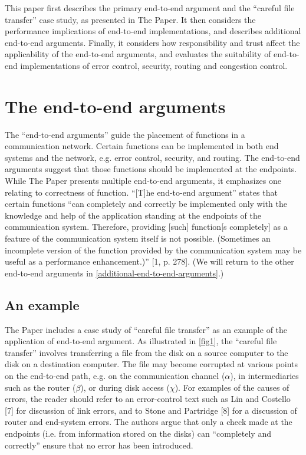 \documentclass[a4paper,11pt,notitlepage,twoside,openright]{article}
\begin{document}
This paper first describes the primary end-to-end argument and the
``careful file transfer'' case study, as presented in The Paper. It then
considers the performance implications of end-to-end implementations,
and describes additional end-to-end arguments. Finally, it considers how
responsibility and trust affect the applicability of the end-to-end
arguments, and evaluates the suitability of end-to-end implementations
of error control, security, routing and congestion control.

\hypertarget{the-end-to-end-arguments}{%
\section{The end-to-end arguments}\label{the-end-to-end-arguments}}

The ``end-to-end arguments'' guide the placement of functions in a
communication network. Certain functions can be implemented in both end
systems and the network, e.g. error control, security, and routing. The
end-to-end arguments suggest that those functions should be implemented
at the endpoints. While The Paper presents multiple end-to-end
arguments, it emphasizes one relating to correctness of function.
``{[}T{]}he end-to-end argument'' states that certain functions ``can
completely and correctly be implemented only with the knowledge and help
of the application standing at the endpoints of the communication
system. Therefore, providing {[}such{]} function{[}s completely{]} as a
feature of the communication system itself is not possible. (Sometimes
an incomplete version of the function provided by the communication
system may be useful as a performance enhancement.)'' {[}1, p. 278{]}.
(We will return to the other end-to-end arguments in \autoref{additional-end-to-end-arguments}.)

\hypertarget{an-example}{%
\subsection{An example}}

The Paper includes a case study of ``careful file transfer'' as an
example of the application of end-to-end argument. As illustrated in
\autoref{fig1}, the ``careful file transfer'' involves transferring a file from
the disk on a source computer to the disk on a destination computer. The
file may become corrupted at various points on the end-to-end path, e.g.
on the communication channel ($\alpha$), in intermediaries such as the router
($\beta$), or during disk access ($\chi$). For examples of the causes of errors,
the reader should refer to an error-control text such as Lin and
Costello {[}7{]} for discussion of link errors, and to Stone and
Partridge {[}8{]} for a discussion of router and end-system errors. The
authors argue that only a check made at the endpoints (i.e. from
information stored on the disks) can ``completely and correctly'' ensure
that no error has been introduced.
\end{document}
